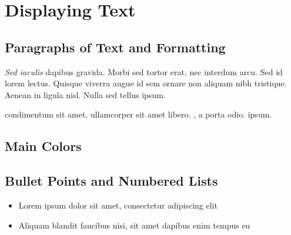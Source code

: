 \section{Displaying Text}
\label{section1}

\clearpage


\subsection{Paragraphs of Text and Formatting}

\textit{Sed iaculis} dapibus gravida. Morbi sed tortor erat, nec interdum arcu. Sed id lorem lectus. Quisque viverra augue id sem ornare non aliquam nibh tristique. Aenean in ligula nisl. Nulla sed tellus ipsum.

\begin{multicols}{2} %
     condimentum sit amet, ullamcorper sit amet libero.
    , a porta odio.
     ipsum.
\end{multicols}

\clearpage


\subsection{Main Colors}

\crule[cprimary]{2cm}{2cm} \crule[csecondary]{2cm}{2cm} \crule[chighlight]{2cm}{2cm}

\clearpage

\subsection{Bullet Points and Numbered Lists}

\begin{itemize}
    \item Lorem ipsum dolor sit amet, consectetur adipiscing elit
    \item Aliquam blandit faucibus nisi, sit amet dapibus enim tempus eu
\end{itemize}

